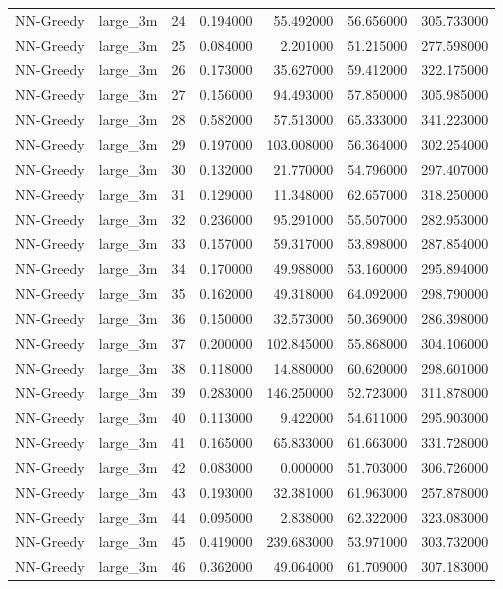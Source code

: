 \begin{tabular}{llrrrrr}
NN-Greedy & large_3m & 24 & 0.194000 & 55.492000 & 56.656000 & 305.733000 \\
NN-Greedy & large_3m & 25 & 0.084000 & 2.201000 & 51.215000 & 277.598000 \\
NN-Greedy & large_3m & 26 & 0.173000 & 35.627000 & 59.412000 & 322.175000 \\
NN-Greedy & large_3m & 27 & 0.156000 & 94.493000 & 57.850000 & 305.985000 \\
NN-Greedy & large_3m & 28 & 0.582000 & 57.513000 & 65.333000 & 341.223000 \\
NN-Greedy & large_3m & 29 & 0.197000 & 103.008000 & 56.364000 & 302.254000 \\
NN-Greedy & large_3m & 30 & 0.132000 & 21.770000 & 54.796000 & 297.407000 \\
NN-Greedy & large_3m & 31 & 0.129000 & 11.348000 & 62.657000 & 318.250000 \\
NN-Greedy & large_3m & 32 & 0.236000 & 95.291000 & 55.507000 & 282.953000 \\
NN-Greedy & large_3m & 33 & 0.157000 & 59.317000 & 53.898000 & 287.854000 \\
NN-Greedy & large_3m & 34 & 0.170000 & 49.988000 & 53.160000 & 295.894000 \\
NN-Greedy & large_3m & 35 & 0.162000 & 49.318000 & 64.092000 & 298.790000 \\
NN-Greedy & large_3m & 36 & 0.150000 & 32.573000 & 50.369000 & 286.398000 \\
NN-Greedy & large_3m & 37 & 0.200000 & 102.845000 & 55.868000 & 304.106000 \\
NN-Greedy & large_3m & 38 & 0.118000 & 14.880000 & 60.620000 & 298.601000 \\
NN-Greedy & large_3m & 39 & 0.283000 & 146.250000 & 52.723000 & 311.878000 \\
NN-Greedy & large_3m & 40 & 0.113000 & 9.422000 & 54.611000 & 295.903000 \\
NN-Greedy & large_3m & 41 & 0.165000 & 65.833000 & 61.663000 & 331.728000 \\
NN-Greedy & large_3m & 42 & 0.083000 & 0.000000 & 51.703000 & 306.726000 \\
NN-Greedy & large_3m & 43 & 0.193000 & 32.381000 & 61.963000 & 257.878000 \\
NN-Greedy & large_3m & 44 & 0.095000 & 2.838000 & 62.322000 & 323.083000 \\
NN-Greedy & large_3m & 45 & 0.419000 & 239.683000 & 53.971000 & 303.732000 \\
NN-Greedy & large_3m & 46 & 0.362000 & 49.064000 & 61.709000 & 307.183000 \\

\end{tabular}

